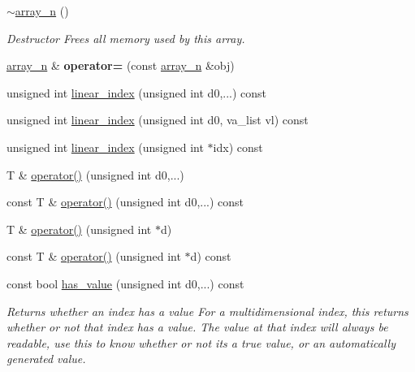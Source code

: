 \begin{DoxyCompactItemize}
\mbox{\label{classsisl_1_1array__n_a50e1f1e74ed7f364ea222d56db5a423c}} 
\hyperlink{classsisl_1_1array__n_a50e1f1e74ed7f364ea222d56db5a423c}{$\sim$array\+\_\+n} ()
\begin{DoxyCompactList}\small\item\em Destructor Frees all memory used by this array. \end{DoxyCompactList}\item 
\mbox{\label{classsisl_1_1array__n_ae8e89fa53677f239480a7766bc56caf7}} 
\hyperlink{classsisl_1_1array__n}{array\+\_\+n} \& {\bfseries operator=} (const \hyperlink{classsisl_1_1array__n}{array\+\_\+n} \&obj)
\item 
unsigned int \hyperlink{classsisl_1_1array__n_a89f13ba676e526aa5ed2814514685dc0}{linear\+\_\+index} (unsigned int d0,...) const
\item 
unsigned int \hyperlink{classsisl_1_1array__n_ad10bc825e1ab2bce68b9da0f98be3f1b}{linear\+\_\+index} (unsigned int d0, va\+\_\+list vl) const
\item 
unsigned int \hyperlink{classsisl_1_1array__n_a04888819bc3567f52f52bdccdecd7e5c}{linear\+\_\+index} (unsigned int $\ast$idx) const
\item 
T \& \hyperlink{classsisl_1_1array__n_a1fa1d22e81493e308a6ad66a5100ca43}{operator()} (unsigned int d0,...)
\item 
const T \& \hyperlink{classsisl_1_1array__n_a9630d1014796a2dc2a6fe08f94841115}{operator()} (unsigned int d0,...) const
\item 
T \& \hyperlink{classsisl_1_1array__n_a33e63f670871d57e28133b212b94a0fc}{operator()} (unsigned int $\ast$d)
\item 
const T \& \hyperlink{classsisl_1_1array__n_a6080746c8b0be2377d391b9cc4c8cf4d}{operator()} (unsigned int $\ast$d) const
\item 
\mbox{\label{classsisl_1_1array__n_a37afb07dd00ec3770758aca57c5e1f42}} 
const bool \hyperlink{classsisl_1_1array__n_a37afb07dd00ec3770758aca57c5e1f42}{has\+\_\+value} (unsigned int d0,...) const
\begin{DoxyCompactList}\small\item\em Returns whether an index has a value For a multidimensional index, this returns whether or not that index has a value. The value at that index will always be readable, use this to know whether or not it\textquotesingle{}s a true value, or an automatically generated value. \end{DoxyCompactList}\item 

\end{DoxyCompactItemize}
